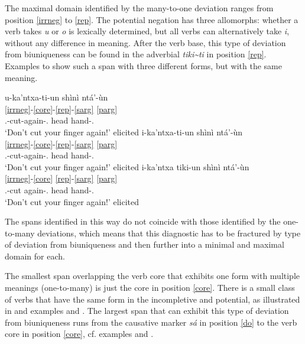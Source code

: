 \documentclass[output=paper]{langscibook}
\begin{document}
The maximal domain identified by the many-to-one deviation ranges from position \ref{irrneg} to \ref{rep}.
The potential negation has three allomorphs: whether a verb takes \textit{u} or \textit{o} is lexically determined, but all verbs can alternatively take \textit{i}, without any difference in meaning. 
After the verb base, this type of deviation from biuniqueness can be found in the adverbial \textit{tiki\textasciitilde{}ti} in position \ref{rep}.
Examples  to  show such a span with three different forms, but with the same meaning.

\ea 
\ea \label{ex:multform1}
\glll  u-ka'ntxa-ti-un  shìnì ntá'-ùn \\
\ref{irrneg}-\ref{core}-\ref{rep}-\ref{sarg} \ref{parg} {} \\
\Neg.\Pot-cut-again-\Ssg.\Nhon{} head hand-\Ssg.\Nhon{} \\
\glt `Don't cut your finger again!' \hfill elicited
\ex \label{ex:multform2}
\glll  i-ka'ntxa-ti-un shìnì ntá'-ùn \\
\ref{irrneg}-\ref{core}-\ref{rep}-\ref{sarg} \ref{parg} {} \\
\Neg.\Pot-cut-again-\Ssg.\Nhon{} head hand-\Ssg.\Nhon{} \\
\glt `Don't cut your finger again!' \hfill elicited
\ex \label{ex:multform3}
\glll  i-ka'ntxa tiki-un  shìnì ntá'-ùn \\
\ref{irrneg}-\ref{core} \ref{rep}-\ref{sarg} \ref{parg} {} \\
\Neg.\Pot-cut again-\Ssg.\Nhon{} head hand-\Ssg.\Nhon{} \\
\glt `Don't cut your finger again!' \hfill elicited
\z
\z


The spans identified in this way do not coincide with those identified by the one-to-many deviations, which means that this diagnostic has to be fractured by type of deviation from biuniqueness and then further into a minimal and maximal domain for each.

The smallest span overlapping the verb core that exhibits one form with multiple meanings (one-to-many) is just the core in position \ref{core}. There is a small class of verbs that have the same form in the incompletive and potential, as illustrated in  and examples  and .
The largest span that can exhibit this type of deviation from biuniqueness runs from the causative marker \textit{sá} in position \ref{do} to the verb core in position \ref{core}, cf. examples  and .
\end{document}
